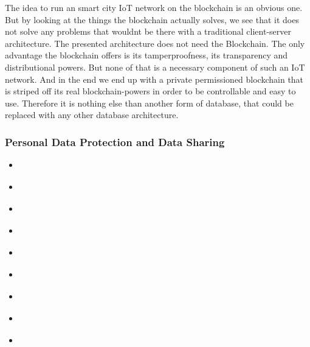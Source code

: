 The idea to run an smart city IoT network on the blockchain is an obvious one. But by looking at the things the blockchain actually solves, we see that it does not solve any problems that wouldnt be there with a traditional client-server architecture. The presented architecture does not need the Blockchain. The only advantage the blockchain offers is its tamperproofness, its transparency and distributional powers. But none of that is a necessary component of such an IoT network. And in the end we end up with a private permissioned blockchain that is striped off its real blockchain-powers in order to be controllable and easy to use. Therefore it is nothing else than another form of database, that could be replaced with any other database architecture.

\subsubsection{Personal Data Protection and Data Sharing}

\begin{itemize}
	\item \cite{Zyskind2015}
	\item \cite{Yue2016}
	\item \cite{Azaria2016}
	\item \cite{Fotiou2016}
	\item \cite{Zhang2017}
	\item \cite{Zhang2018}
	\item \cite{Esposito2018}
	\item \cite{Ekblaw2016}
	\item \cite{Cao2019}
\end{itemize}

